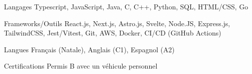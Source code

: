 
\begin{cvskills}
  \cvskill
    {Langages} %
    {Typescript, JavaScript, Java, C, C++, Python, SQL, HTML/CSS, Go} %

  \cvskill
    {Frameworks/Outils} %
    {React.js, Next.js, Astro.js, Svelte, Node.JS, Express.js, TailwindCSS, Jest/Vitest, Git, AWS, Docker, CI/CD (GitHub Actions)} %
    
  \cvskill
    {Langues} %
    {Français (Natale), Anglais (C1), Espagnol (A2)} %
    
  \cvskill
    {Certifications} %
    {Permis B avec un véhicule personnel} %
\end{cvskills}
